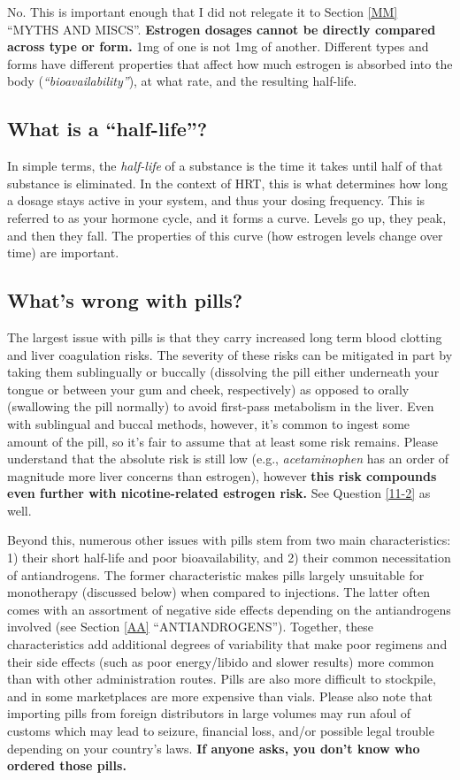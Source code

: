 \documentclass{article}
\begin{document}
No. This is important enough that I did not relegate it to Section \ref{MM} “MYTHS AND MISCS”. \textbf{Estrogen dosages cannot be directly compared across type or form.} 1mg of one is not 1mg of another. Different types and forms have different properties that affect how much estrogen is absorbed into the body (\textit{“bioavailability”}), at what rate, and the resulting half-life.

\subsection{What is a “half-life”?}

In simple terms, the \textit{half-life} of a substance is the time it takes until half of that substance is eliminated. In the context of HRT, this is what determines how long a dosage stays active in your system, and thus your dosing frequency. This is referred to as your hormone cycle, and it forms a curve. Levels go up, they peak, and then they fall. The properties of this curve (how estrogen levels change over time) are important.

\subsection{What’s wrong with pills?}

The largest issue with pills is that they carry increased long term blood clotting and liver coagulation risks. The severity of these risks can be mitigated in part by taking them sublingually or buccally (dissolving the pill either underneath your tongue or between your gum and cheek, respectively) as opposed to orally (swallowing the pill normally) to avoid first-pass metabolism in the liver. Even with sublingual and buccal methods, however, it's common to ingest some amount of the pill, so it’s fair to assume that at least some risk remains. Please understand that the absolute risk is still low (e.g., \textit{acetaminophen} has an order of magnitude more liver concerns than estrogen), however \textbf{this risk compounds even further with nicotine-related estrogen risk.} See Question \ref{11-2} as well.

Beyond this, numerous other issues with pills stem from two main characteristics: 1) their short half-life and poor bioavailability, and 2) their common necessitation of antiandrogens. The former characteristic makes pills largely unsuitable for monotherapy (discussed below) when compared to injections. The latter often comes with an assortment of negative side effects depending on the antiandrogens involved (see Section \ref{AA} “ANTIANDROGENS”). Together, these characteristics add additional degrees of variability that make poor regimens and their side effects (such as poor energy/libido and slower results) more common than with other administration routes. Pills are also more difficult to stockpile, and in some marketplaces are more expensive than vials. Please also note that importing pills from foreign distributors in large volumes may run afoul of customs which may lead to seizure, financial loss, and/or possible legal trouble depending on your country's laws. \textbf{If anyone asks, you don't know who ordered those pills.}
\end{document}
